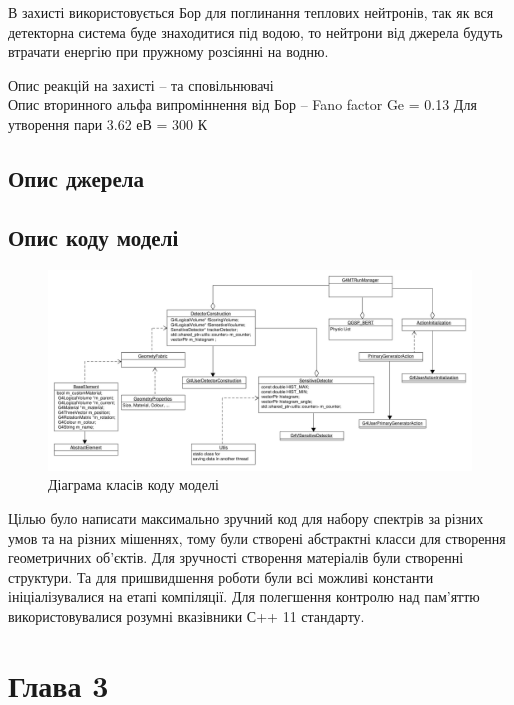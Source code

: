 \documentclass[a4paper, 14pt]{article}
\numberwithin{equation}{section}
\numberwithin{table}{section}
\begin{document}
	В захисті використовується Бор для поглинання теплових нейтронів, так як вся детекторна система буде знаходитися під водою, то нейтрони від джерела будуть втрачати енергію при пружному розсіянні на водню. 
	
	Опис реакцій на захисті -- та сповільнювачі \\
	Опис вторинного альфа випроміннення від Бор --
	Fano factor Ge = 0.13 
	Для утворення пари 3.62 еВ = 300 К

\subsection{Опис джерела}
	
	
\subsection{Опис коду моделі}

	\begin{figure}[hbt!]
		\centering \includegraphics[width=1\textwidth]{res/classDiagram.pdf}
		\caption{Діаграма класів коду моделі} 
		\label{ris:s_classDiagram}	
	\end{figure} 

	Цілью було написати максимально зручний код для набору спектрів за різних умов та на різних мішеннях, тому були створені абстрактні класси для створення геометричних об'єктів. Для зручності створення матеріалів були створенні структури. 
	Та для пришвидшення роботи були всі можливі константи ініціалізувалися на етапі компіляції. Для полегшення контролю над пам'яттю використовувалися розумні вказівники С++ 11 стандарту.
	
\newpage 
\section{Глава 3}
\setcounter{figure}{0}
\end{document}
